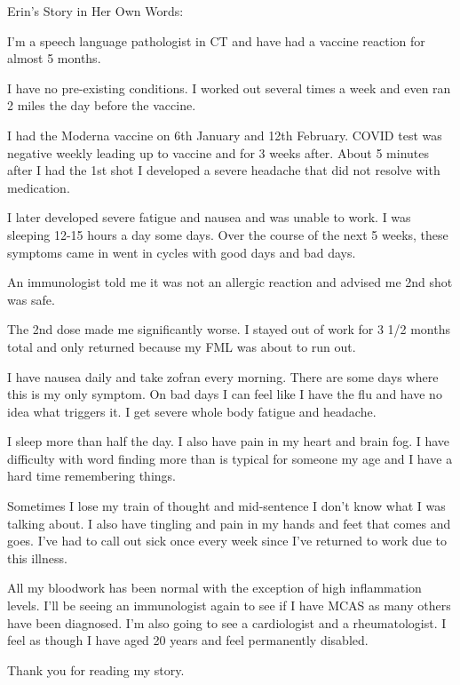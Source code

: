 Erin’s Story in Her Own Words:

I’m a speech language pathologist in CT and have had a vaccine reaction for
almost 5 months.

I have no pre-existing conditions. I worked out several times a week and even
ran 2 miles the day before the vaccine.

I had the Moderna vaccine on 6th January and 12th February. COVID test was
negative weekly leading up to vaccine and for 3 weeks after.  About 5 minutes
after I had the 1st shot I developed a severe headache that did not resolve with
medication.

I later developed severe fatigue and nausea and was unable to work. I was
sleeping 12-15 hours a day some days. Over the course of the next 5 weeks, these
symptoms came in went in cycles with good days and bad days.

An immunologist told me it was not an allergic reaction and advised me 2nd shot
was safe.

The 2nd dose made me significantly worse. I stayed out of work for 3 1/2 months
total and only returned because my FML was about to run out.

I have nausea daily and take zofran every morning. There are some days where
this is my only symptom. On bad days I can feel like I have the flu and have no
idea what triggers it. I get severe whole body fatigue and headache.

I sleep more than half the day. I also have pain in my heart and brain fog. I
have difficulty with word finding more than is typical for someone my age and I
have a hard time remembering things.

Sometimes I lose my train of thought and mid-sentence I don’t know what I was
talking about. I also have tingling and pain in my hands and feet that comes and
goes. I’ve had to call out sick once every week since I’ve returned to work due
to this illness.

All my bloodwork has been normal with the exception of high inflammation
levels. I’ll be seeing an immunologist again to see if I have MCAS as many
others have been diagnosed. I’m also going to see a cardiologist and a
rheumatologist. I feel as though I have aged 20 years and feel permanently
disabled.

Thank you for reading my story.
